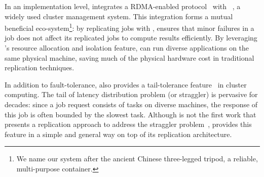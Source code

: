 
In an implementation level, \xxx integrates a RDMA-enabled \paxos 
protocol~\cite{falcon:github} with \mesos~\cite{mesos:nsdi11}, a widely used 
cluster management system. This integration forms a mutual beneficial 
eco-system\footnote{We name 
our system after the ancient Chinese three-legged tripod, a reliable, 
multi-purpose container.}: by replicating jobs with \paxos, \xxx ensures that 
minor failures in a job does not affect its replicated jobs to compute 
results efficiently. By leveraging \mesos's resource allocation and isolation 
feature, \xxx can run diverse applications on the same physical machine, saving 
much of the physical hardware cost in traditional replication techniques.




In addition to fault-tolerance, \xxx also provides a tail-tolerance 
feature~\cite{tail:cacm13} in cluster computing. The tail of latency 
distribution problem (or straggler) is pervasive for decades: since a 
job request consists of tasks on diverse machines, the response of this 
job is often bounded by the slowest task. Although \xxx is not the first work 
that presents a replication approach to address the straggler 
problem~\cite{dolly:nsdi13}, \xxx provides this feature in a simple and general 
way on top of its \paxos replication architecture.



